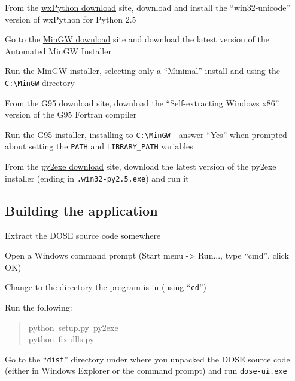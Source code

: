 \documentclass[10pt,a4paper,english]{article}
\begin{document}
\begin{list}{.}
\item {} 
From the \href{http://wxpython.org/download.php\#binaries}{wxPython download} site, download and install the ``win32-unicode'' version of wxPython
for Python 2.5

\item {} 
Go to the \href{http://sourceforge.net/project/showfiles.php?group_id=2435&package_id=240780}{MinGW download} site and download the latest version of the Automated MinGW
Installer

\item {} 
Run the MinGW installer, selecting only a ``Minimal'' install and using the \texttt{C:{\textbackslash}MinGW} directory

\item {} 
From the \href{http://ftp.g95.org/}{G95 download} site, download the ``Self-extracting Windows x86'' version of the G95
Fortran compiler

\item {} 
Run the G95 installer, installing to \texttt{C:{\textbackslash}MinGW} - answer ``Yes'' when prompted about setting the
\texttt{PATH} and \texttt{LIBRARY{\_}PATH} variables

\item {} 
From the \href{http://sourceforge.net/project/showfiles.php?group_id=15583}{py2exe download} site, download the latest version of the py2exe installer (ending in
\texttt{.win32-py2.5.exe}) and run it

\end{list}



\hypertarget{building-the-application}{}
\subsection*{Building the application}
\setcounter{listcnt0}{0}
\begin{list}{.}
{
\setlength{\rightmargin}{\leftmargin}
}
\item {} 
Extract the DOSE source code somewhere

\item {} 
Open a Windows command prompt (Start menu -{\textgreater} Run..., type ``cmd'', click OK)

\item {} 
Change to the directory the program is in (using ``\texttt{cd}'')

\item {} 
Run the following:
\begin{quote}{\ttfamily \raggedright \noindent
python~setup.py~py2exe~\\
python~fix-dlls.py
}\end{quote}

\item {} 
Go to the ``\texttt{dist}'' directory under where you unpacked the DOSE source code (either in Windows
Explorer or the command prompt) and run \texttt{dose-ui.exe}

\end{list}
\end{document}
